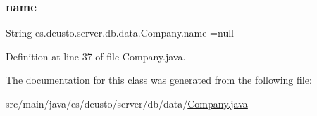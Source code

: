 \subsubsection{\texorpdfstring{name}{name}}
{\footnotesize\ttfamily String es.\+deusto.\+server.\+db.\+data.\+Company.\+name =null\hspace{0.3cm}{\ttfamily [protected]}}



Definition at line 37 of file Company.\+java.



The documentation for this class was generated from the following file\+:\begin{DoxyCompactItemize}
\item 
src/main/java/es/deusto/server/db/data/\hyperlink{_company_8java}{Company.\+java}\end{DoxyCompactItemize}
